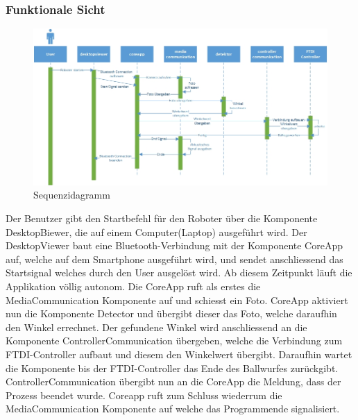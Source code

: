 	\subsubsection{Funktionale Sicht}
	
	\begin{figure}[h!]
		\centering
		\includegraphics[width=1\textwidth]{Enddokumentation/Loesungskonzept/Bilder/Sequenzdiagramm.jpg}
		\caption{Sequenzidagramm}		
	\end{figure}
Der Benutzer gibt den Startbefehl für den Roboter über die Komponente DesktopBiewer, die auf einem Computer(Laptop) ausgeführt wird. Der DesktopViewer baut eine Bluetooth-Verbindung mit der Komponente CoreApp auf, welche auf dem Smartphone ausgeführt wird, und sendet anschliessend das Startsignal welches durch den User ausgelöst wird. Ab diesem Zeitpunkt läuft die Applikation völlig autonom. Die CoreApp ruft als erstes die MediaCommunication Komponente auf und schiesst ein Foto. CoreApp aktiviert nun die Komponente Detector und übergibt dieser das Foto, welche daraufhin den Winkel errechnet. Der gefundene Winkel wird anschliessend an die Komponente ControllerCommunication übergeben, welche die Verbindung zum FTDI-Controller aufbaut und diesem den Winkelwert übergibt. Daraufhin wartet die Komponente bis der FTDI-Controller das Ende des Ballwurfes zurückgibt. ControllerCommunication übergibt nun an die CoreApp die Meldung, dass der Prozess beendet wurde. 
Coreapp ruft zum Schluss wiederrum die MediaCommunication Komponente auf welche das Programmende signalisiert.